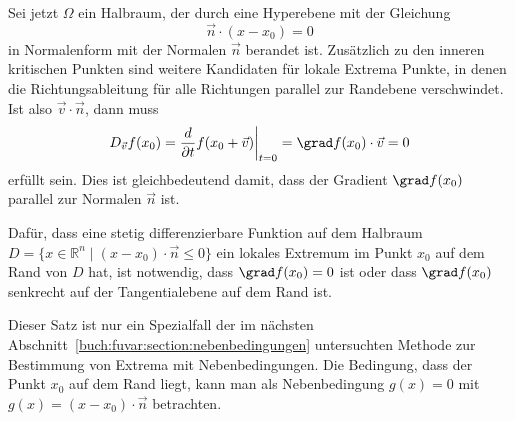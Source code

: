 Sei jetzt $\Omega$ ein Halbraum, der durch eine Hyperebene mit der Gleichung
\[
\vec{n}\cdot (x-x_0) = 0
\]
in Normalenform mit der Normalen $\vec{n}$ berandet ist.
Zusätzlich zu den inneren kritischen Punkten sind weitere Kandidaten
für lokale Extrema Punkte, in denen die Richtungsableitung für alle
Richtungen parallel zur Randebene verschwindet.
Ist also $\vec{v}\cdot \vec{n}$, dann muss
\[
D_{\vec{v}} f(x_0)
=
\frac{d}{\partial t}f(x_0+\vec{v})\bigg|_{t=0}
=
\grad f(x_0)\cdot \vec{v}
=
0
\]
erfüllt sein.
Dies ist gleichbedeutend damit, dass der Gradient $\grad f(x_0)$ parallel
zur Normalen $\vec{n}$ ist.

\begin{satz}
Dafür, dass eine stetig differenzierbare Funktion auf dem Halbraum
$D=\{x\in\mathbb{R}^n\mid (x-x_0)\cdot\vec{n}\le 0\}$ ein lokales 
Extremum im Punkt $x_0$ auf dem Rand von $D$ hat, ist notwendig,
dass $\grad f(x_0)=0$ ist oder dass $\grad f(x_0)$ senkrecht auf der Tangentialebene auf dem Rand ist.
\end{satz}

Dieser Satz ist nur ein Spezialfall der im nächsten
Abschnitt~\ref{buch:fuvar:section:nebenbedingungen}
untersuchten Methode zur Bestimmung von Extrema mit Nebenbedingungen.
Die Bedingung, dass der Punkt $x_0$ auf dem Rand liegt, kann man
als Nebenbedingung $g(x) = 0$ mit $g(x)=(x-x_0)\cdot\vec{n}$ betrachten.

